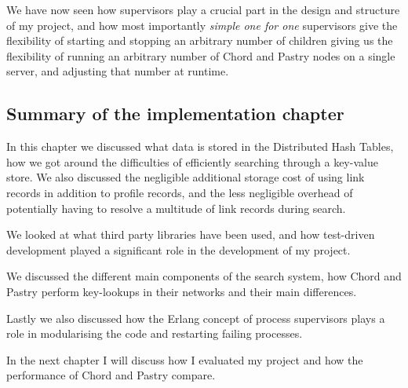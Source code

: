 \mbox{}

We have now seen how supervisors play a crucial part in the design and structure of my project, and how most importantly \emph{simple one for one} supervisors give the flexibility of starting and stopping an arbitrary number of children giving us the flexibility of running an arbitrary number of Chord and Pastry nodes on a single server, and adjusting that number at runtime.

\subsection{Summary of the implementation chapter}
In this chapter we discussed what data is stored in the Distributed Hash Tables, how we got around the difficulties of efficiently searching through a key-value store. We also discussed the negligible additional storage cost of using link records in addition to profile records, and the less negligible overhead of potentially having to resolve a multitude of link records during search.

We looked at what third party libraries have been used, and how test-driven development played a significant role in the development of my project.

We discussed the different main components of the search system, how Chord and Pastry perform key-lookups in their networks and their main differences.

Lastly we also discussed how the Erlang concept of process supervisors plays a role in modularising the code and restarting failing processes.

In the next chapter I will discuss how I evaluated my project and how the performance of Chord and Pastry compare.

